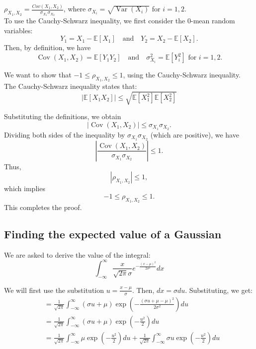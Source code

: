 \documentclass[a4paper]{article}
\begin{document}
$\rho_{X_1, X_2} = \frac{Cov(X_1, X_2)}{\sigma_{X_1} \sigma_{X_2}}$, where \(\sigma_{X_i} = \sqrt{\operatorname{Var}(X_i)}\) for \(i=1,2\).\\

To use the Cauchy-Schwarz inequality, we first consider the 0-mean random variables:
\[
Y_1 = X_1 - \mathbb{E}[X_1] \quad \text{and} \quad Y_2 = X_2 - \mathbb{E}[X_2].
\]
Then, by definition, we have
\[
\operatorname{Cov}(X_1, X_2) = \mathbb{E}[Y_1 Y_2] \quad \text{and} \quad \sigma_{X_i}^2 = \mathbb{E}[Y_i^2] \text{ for } i=1,2.
\]

We want to show that $-1 \leq \rho_{X_1, X_2} \leq 1$, using the Cauchy-Schwarz inequality.\\

The Cauchy-Schwarz inequality states that:
\begin{equation*}
    |\mathbb{E}[X_1 X_2]| \leq \sqrt{\mathbb{E}[X_1^2] \mathbb{E}[X_2^2]}
\end{equation*}

Substituting the definitions, we obtain
\[
|\operatorname{Cov}(X_1, X_2)| \leq \sigma_{X_1}\sigma_{X_2}.
\]
Dividing both sides of the inequality by \(\sigma_{X_1}\sigma_{X_2}\) (which are positive), we have
\[
\left|\frac{\operatorname{Cov}(X_1, X_2)}{\sigma_{X_1}\sigma_{X_2}}\right| \leq 1.
\]
Thus,
\[
|\rho_{X_1, X_2}| \leq 1,
\]
which implies
\[
-1 \leq \rho_{X_1, X_2} \leq 1.
\]
This completes the proof.
\newpage

\subsection{Finding the expected value of a Gaussian}

We are asked to derive the value of the integral:
\begin{equation*}
    \int_{-\infty}^{\infty} \frac{x}{\sqrt{2\pi} \sigma} e^{-\frac{(x-\mu)^2}{2\sigma^2}} dx
\end{equation*}

We will first use the substitution $u = \frac{x - \mu}{\sigma}$. Then, $dx = \sigma du$. Substituting, we get:
\begin{align*}
    &= \frac{1}{\sqrt{2\pi}} \int_{-\infty}^{\infty} (\sigma u + \mu) \exp(-\frac{(\sigma u + \mu - \mu)^2}{2\sigma^2}) du\\
    &= \frac{1}{\sqrt{2\pi}} \int_{-\infty}^{\infty} (\sigma u + \mu) \exp(-\frac{u^2}{2}) du\\
    &= \frac{1}{\sqrt{2\pi}} \int_{-\infty}^{\infty} \mu \exp(-\frac{u^2}{2}) du + \frac{1}{\sqrt{2\pi}} \int_{-\infty}^{\infty} \sigma u \exp(-\frac{u^2}{2}) du
\end{align*}
\end{document}
